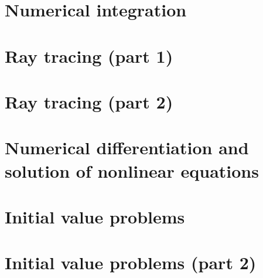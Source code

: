 \documentclass{article}
\begin{document}
\section{Numerical integration}


\section{Ray tracing (part 1)}


\section{Ray tracing (part 2)}


\section{Numerical differentiation and solution of nonlinear equations}


\section{Initial value problems}


\section{Initial value problems (part 2)}

\end{document}
